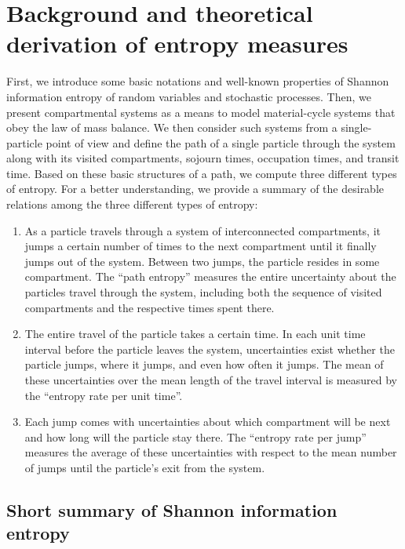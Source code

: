 \documentclass[smallextended]{svjour3}
\renewcommand{\emph}[1]{``#1''}
\begin{document}
\section{Background and theoretical derivation of entropy measures}
First, we introduce some basic notations and well-known properties of Shannon information entropy of random variables and stochastic processes.
Then, we present compartmental systems as a means to model material-cycle systems that obey the law of mass balance.
We then consider such systems from a single-particle point of view and define the path of a single particle through the system along with its visited compartments, sojourn times, occupation times, and transit time.
Based on these basic structures of a path, we compute three different types of entropy.
For a better understanding, we provide a summary of the desirable relations among the three different types of entropy:
\begin{enumerate}[(1)]
  \item 	As a particle travels through a system of interconnected compartments, it jumps a certain number of times to the next compartment until it finally jumps out of the system.
	Between two jumps, the particle resides in some compartment.
  The \emph{path entropy} measures the entire uncertainty about the particles travel through the system, including both the sequence of visited compartments and the respective times spent there.

	\item The entire travel of the particle takes a certain time.
	In each unit time interval before the particle leaves the system, uncertainties exist whether the particle jumps, where it jumps, and even how often it jumps.
	The mean of these uncertainties over the mean length of the travel interval is measured by the \emph{entropy rate per unit time}.

	\item Each jump comes with uncertainties about which compartment will be next and how long will the particle stay there.
	The \emph{entropy rate per jump} measures the average of these uncertainties with respect to the mean number of jumps until the particle's exit from the system.
\end{enumerate}


\subsection{Short summary of Shannon information entropy}
\label{sec:entropy_basics}
\end{document}
